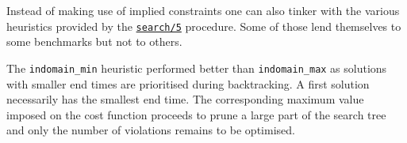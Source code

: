 Instead of making use of implied constraints one can also tinker with the various heuristics provided by the \href{http://eclipseclp.org/doc/bips/lib/ic/search-6.html}{\texttt{search/5}} procedure. Some of those lend themselves to some benchmarks but not to others.\par
The \texttt{indomain\_min} heuristic performed better than \texttt{indomain\_max} as solutions with smaller end times are prioritised during backtracking. A first solution necessarily has the smallest end time. The corresponding maximum value imposed on the cost function proceeds to prune a large part of the search tree and only the number of violations remains to be optimised.